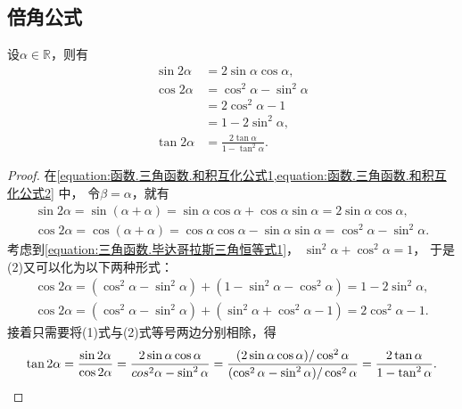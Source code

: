 \subsection{倍角公式}
\begin{proposition}[二倍角公式]
设\(\alpha\in\mathbb{R}\)，则有
\begin{align}
	\sin2\alpha &= 2 \sin\alpha \cos\alpha,
		\label{equation:三角函数.正弦的二倍角公式} \\
	\cos2\alpha &= \cos^2\alpha - \sin^2\alpha
		\label{equation:三角函数.余弦的二倍角公式1} \\
		&= 2 \cos^2\alpha - 1 \\
		&= 1 - 2 \sin^2\alpha, \\
	\tan2\alpha &= \frac{2 \tan\alpha}{1 - \tan^2\alpha}.
		\label{equation:三角函数.正切的二倍角公式}
\end{align}
\begin{proof}
在\cref{equation:函数.三角函数.和积互化公式1,equation:函数.三角函数.和积互化公式2} 中，
令\(\beta=\alpha\)，就有\begin{gather*}
	\sin2\alpha
	=\sin(\alpha+\alpha)
	=\sin\alpha\cos\alpha+\cos\alpha\sin\alpha
	=2\sin\alpha\cos\alpha,
	\tag{1} \\
	\cos2\alpha
	=\cos(\alpha+\alpha)
	=\cos\alpha\cos\alpha-\sin\alpha\sin\alpha
	=\cos^2\alpha-\sin^2\alpha.
	\tag{2}
\end{gather*}
考虑到\cref{equation:三角函数.毕达哥拉斯三角恒等式1}，
\(\sin^2\alpha+\cos^2\alpha=1\)，
于是(2)又可以化为以下两种形式：\begin{gather*}
	\cos2\alpha
	=(\cos^2\alpha-\sin^2\alpha)+(1-\sin^2\alpha-\cos^2\alpha)
	=1-2\sin^2\alpha, \\
	\cos2\alpha
	=(\cos^2\alpha-\sin^2\alpha)+(\sin^2\alpha+\cos^2\alpha-1)
	=2\cos^2\alpha-1.
\end{gather*}
接着只需要将(1)式与(2)式等号两边分别相除，得\begin{equation*}
	\tan2\alpha=\frac{\sin2\alpha}{\cos2\alpha}
	=\frac{2\sin\alpha\cos\alpha}{cos^2\alpha-\sin^2\alpha}
	=\frac{(2\sin\alpha\cos\alpha)/\cos^2\alpha}
		{(\cos^2\alpha-\sin^2\alpha)/\cos^2\alpha}
	=\frac{2\tan\alpha}{1-\tan^2\alpha}.
	\qedhere
\end{equation*}
\end{proof}
\end{proposition}

